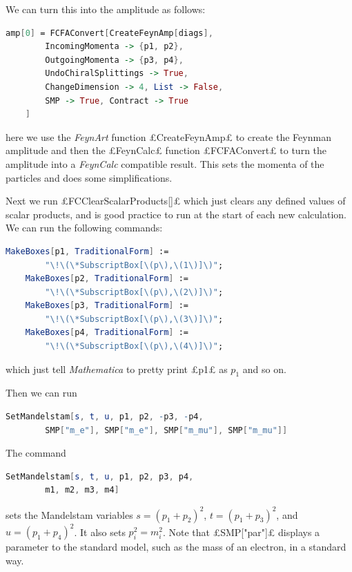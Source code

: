 We can turn this into the amplitude as follows:
\begin{lstlisting}[language=mathematica, gobble=4]
    amp[0] = FCFAConvert[CreateFeynAmp[diags],
        IncomingMomenta -> {p1, p2},
        OutgoingMomenta -> {p3, p4},
        UndoChiralSplittings -> True,
        ChangeDimension -> 4, List -> False, 
        SMP -> True, Contract -> True
    ]
\end{lstlisting}
here we use the \textit{FeynArt} function £CreateFeynAmp£ to create the Feynman amplitude and then the £FeynCalc£ function £FCFAConvert£ to turn the amplitude into a \textit{FeynCalc} compatible result.
This sets the momenta of the particles and does some simplifications.

Next we run £FCClearScalarProducts[]£ which just clears any defined values of scalar products, and is good practice to run at the start of each new calculation.
We can run the following commands:
\begin{lstlisting}[language=mathematica, gobble=4]
    MakeBoxes[p1, TraditionalForm] :=
        "\!\(\*SubscriptBox[\(p\),\(1\)]\)";
    MakeBoxes[p2, TraditionalForm] :=
        "\!\(\*SubscriptBox[\(p\),\(2\)]\)";
    MakeBoxes[p3, TraditionalForm] :=
        "\!\(\*SubscriptBox[\(p\),\(3\)]\)";
    MakeBoxes[p4, TraditionalForm] :=
        "\!\(\*SubscriptBox[\(p\),\(4\)]\)";
\end{lstlisting}
which just tell \textit{Mathematica} to pretty print £p1£ as \(p_1\) and so on.

Then we can run
\begin{lstlisting}[language=mathematica, gobble=4]
    SetMandelstam[s, t, u, p1, p2, -p3, -p4,
        SMP["m_e"], SMP["m_e"], SMP["m_mu"], SMP["m_mu"]]
\end{lstlisting}
The command
\begin{lstlisting}[language=mathematica, gobble=4]
    SetMandelstam[s, t, u, p1, p2, p3, p4,
        m1, m2, m3, m4]
\end{lstlisting}
sets the Mandelstam variables \(s = (p_1 + p_2)^2\), \(t = (p_1 + p_3)^2\), and \(u = (p_1 + p_4)^2\).
It also sets \(p_i^2 = m_i^2\).
Note that £SMP["par"]£ displays a parameter to the standard model, such as the mass of an electron, in a standard way.

